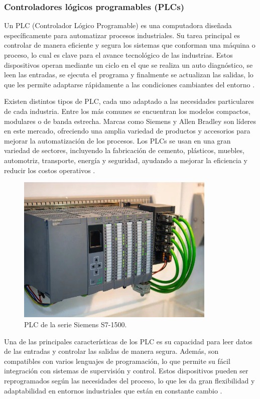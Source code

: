 \subsubsection{Controladores lógicos programables (PLCs)}

Un PLC (Controlador Lógico Programable) es una computadora diseñada específicamente para automatizar procesos industriales. Su tarea principal es controlar de manera eficiente y segura los sistemas que conforman una máquina o proceso, lo cual es clave para el avance tecnológico de las industrias. Estos dispositivos operan mediante un ciclo en el que se realiza un auto diagnóstico, se leen las entradas, se ejecuta el programa y finalmente se actualizan las salidas, lo que les permite adaptarse rápidamente a las condiciones cambiantes del entorno  \cite{plc_info}.

Existen distintos tipos de PLC, cada uno adaptado a las necesidades particulares de cada industria. Entre los más comunes se encuentran los modelos compactos, modulares o de banda estrecha. Marcas como Siemens y Allen Bradley son líderes en este mercado, ofreciendo una amplia variedad de productos y accesorios para mejorar la automatización de los procesos. Los PLCs se usan en una gran variedad de sectores, incluyendo la fabricación de cemento, plásticos, muebles, automotriz, transporte, energía y seguridad, ayudando a mejorar la eficiencia y reducir los costos operativos  \cite{plc_info}.

\begin{figure} [h!]
  \begin{center}
    \includegraphics[width=9.5cm]{figs/info_plc}
  \end{center}
  \caption{\centering PLC de la serie Siemens S7-1500.}
  \label{fig:info_plc}
\end{figure} 

Una de las principales características de los PLC es su capacidad para leer datos de las entradas y controlar las salidas de manera segura. Además, son compatibles con varios lenguajes de programación, lo que permite su fácil integración con sistemas de supervisión y control. Estos dispositivos pueden ser reprogramados según las necesidades del proceso, lo que les da gran flexibilidad y adaptabilidad en entornos industriales que están en constante cambio  \cite{plc_info}. \\

